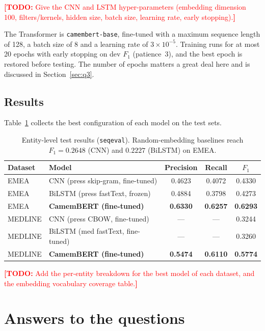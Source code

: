 \documentclass[11pt,a4paper]{article}
\newcommand{\TODO}[1]{\textcolor{red}{\textbf{[TODO:} #1\textbf{]}}}
\begin{document}
\TODO{Give the CNN and LSTM hyper-parameters (embedding dimension 100, filters/kernels, hidden
size, batch size, learning rate, early stopping).}

The Transformer is \texttt{camembert-base}, fine-tuned with a maximum sequence length of 128, a
batch size of 8 and a learning rate of $3\times10^{-5}$. Training runs for at most 20 epochs
with early stopping on dev $F_1$ (patience~3), and the best epoch is restored before testing.
The number of epochs matters a great deal here and is discussed in
Section~\ref{sec:q3}.

\subsection{Results}
\label{sec:ner-results}

Table~\ref{tab:results} collects the best configuration of each model on the test sets.

\begin{table}[h]
\centering
\begin{tabular}{llccc}
\toprule
Dataset & Model & Precision & Recall & $F_1$ \\
\midrule
EMEA    & CNN (press skip-gram, fine-tuned)   & 0.4623 & 0.4072 & 0.4330 \\
EMEA    & BiLSTM (press fastText, frozen)     & 0.4884 & 0.3798 & 0.4273 \\
EMEA    & \textbf{CamemBERT (fine-tuned)}     & \textbf{0.6330} & \textbf{0.6257} & \textbf{0.6293} \\
\midrule
MEDLINE & CNN (press CBOW, fine-tuned)        & ---    & ---    & 0.3244 \\
MEDLINE & BiLSTM (med fastText, fine-tuned)   & ---    & ---    & 0.3260 \\
MEDLINE & \textbf{CamemBERT (fine-tuned)}     & \textbf{0.5474} & \textbf{0.6110} & \textbf{0.5774} \\
\bottomrule
\end{tabular}
\caption{Entity-level test results (\texttt{seqeval}). Random-embedding baselines reach
$F_1=0.2648$ (CNN) and $0.2227$ (BiLSTM) on EMEA.}
\label{tab:results}
\end{table}

\TODO{Add the per-entity breakdown for the best model of each dataset, and the embedding
vocabulary coverage table.}

\section{Answers to the questions}
\label{sec:questions}
\end{document}
